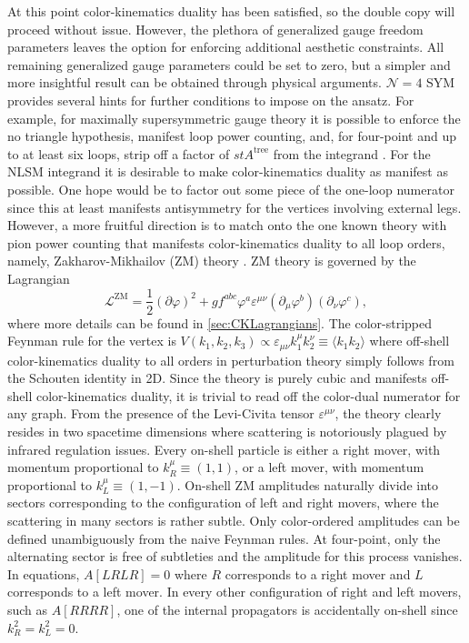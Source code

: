 \documentclass[11pt,letter]{article}
\newcommand{\atree}{\ensuremath{A^{\text{tree}}}}
\begin{document}
At this point color-kinematics duality has been satisfied, so the
double copy will proceed without issue.  However, the plethora of
generalized gauge freedom parameters leaves the option for enforcing
additional aesthetic constraints.  All remaining generalized gauge
parameters could be set to zero, but a simpler and more insightful
result can be obtained through physical arguments.  $\mathcal{N}=4$
SYM provides several hints for further conditions to impose on the
ansatz.  For example, for maximally supersymmetric gauge theory it is
possible to enforce the no triangle hypothesis, manifest loop power
counting, and, for four-point and up to at least six loops, strip off
a factor of $st \atree$ from the integrand \cite{FiveLoopN4,
  Bern:2012uf, Bern:2010fy, SuperSum, Carrasco:2021otn,
  JJHenrikReview, BRY, BDDPR, Neq44np}.  For the NLSM integrand it is
desirable to make color-kinematics duality as manifest as possible.
One hope would be to factor out some piece of the one-loop numerator
since this at least manifests antisymmetry for the vertices involving
external legs.  However, a more fruitful direction is to match onto
the one known theory with pion power counting that manifests
color-kinematics duality to all loop orders, namely,
Zakharov-Mikhailov (ZM) theory \cite{Zakharov:1973pp, Cheung:2022mix}.
ZM theory is governed by the Lagrangian
\begin{equation}
\label{eq:ZMLagrangian}
\mathcal{L}^{\text{ZM}} = \frac{1}{2}(\partial \varphi)^2
+ g f^{abc} \varphi^a \varepsilon^{\mu\nu}(\partial_\mu \varphi^b)( \partial_\nu \varphi^c),
\end{equation}
where more details can be found in \cref{sec:CKLagrangians}.  The
color-stripped Feynman rule for the vertex is
$V(k_1, k_2, k_3) \propto \varepsilon_{\mu\nu}k_1^\mu k_2^\nu \equiv \langle k_1 k_2 \rangle$ where
off-shell color-kinematics duality to all orders in perturbation
theory simply follows from the Schouten identity in 2D.  Since the theory
is purely cubic and manifests off-shell color-kinematics
duality, it is trivial to read off the color-dual numerator for any
graph.  From the presence of the Levi-Civita tensor
$\varepsilon^{\mu\nu}$, the theory clearly resides in two spacetime
dimensions where scattering is notoriously plagued by infrared
regulation issues.  Every on-shell particle is either a right mover,
with momentum proportional to $k_R^\mu \equiv (1,1)$, or a left mover,
with momentum proportional to $k_L^\mu \equiv (1,-1)$.  On-shell ZM
amplitudes naturally divide into sectors corresponding to the
configuration of left and right movers, where the scattering in many
sectors is rather subtle.  Only color-ordered amplitudes can be
defined unambiguously from the naive Feynman rules.  At four-point, only the
alternating sector is free of subtleties and the amplitude for this
process vanishes.  In equations, $A[LRLR]=0$ where $R$ corresponds to
a right mover and $L$ corresponds to a left mover.  In every other
configuration of right and left movers, such as $A[RRRR]$, one of the
internal propagators is accidentally on-shell since $k_R^2=k_L^2=0$.
\end{document}
